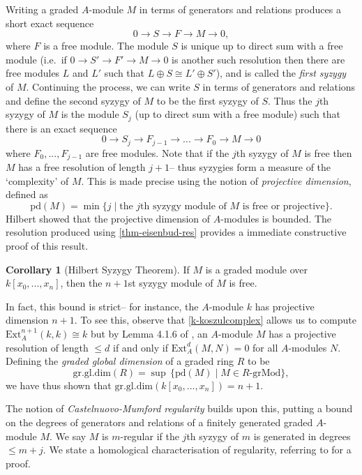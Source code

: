 \documentclass[a4paper]{article}
\theoremstyle{definition}
\newtheorem{cor}[defn]{Corollary}
\theoremstyle{remark}
\newcommand{\grMod}{\ensuremath{\text{-grMod}}}
\begin{document}
Writing a graded \(A\)-module \(M\) in terms of generators and relations
produces a short exact sequence 
\[0\rightarrow S\rightarrow F \rightarrow M \rightarrow 0, \]
where \(F\) is a free module. The module \(S\) is unique up to direct sum with
a free module (i.e.\ if \(0\rightarrow S' \rightarrow F'
\rightarrow M \rightarrow 0\) is another such resolution then
there are free modules \(L\) and \(L'\) such that \(L\oplus S \cong L'\oplus
S'\)), and is called the \textit{first syzygy} of \(M\). Continuing
the process, we can write \(S\) in terms of generators and
relations and define the second syzygy of \(M\) to be the first
syzygy of \(S\). Thus the \(j\)th syzygy of \(M\) is the module \(S_j\) (up to direct sum with a free module) such that there is an exact sequence 
\[0\rightarrow S_j \rightarrow F_{j-1} \rightarrow ...
\rightarrow F_0 \rightarrow M \rightarrow 0\] 
where \(F_0,...,F_{j-1}\) are free modules. Note that if the \(j\)th syzygy of
\(M\) is free then \(M\) has a free resolution of length \(j+1\)-- thus syzygies
form a measure of the `complexity' of \(M\). This is made precise using the
notion of \textit{projective dimension}, defined as
\[\text{pd}(M)=\min\{j\;|\; \text{the }j\text{th syzygy module of \(M\) is free
or projective}\}.\]
Hilbert showed that the projective dimension of \(A\)-modules is bounded. The
resolution produced using \cref{thm-eisenbud-res} provides a immediate
constructive proof of this result.

\begin{cor}[Hilbert Syzygy Theorem]
    If \(M\) is a graded module over \(k[x_0,...,x_n]\), then the \(n+1\)st
    syzygy module of \(M\) is free. 
\end{cor}

In fact, this bound is strict-- for instance, the \(A\)-module \(k\) has
projective dimension \(n+1\). To see this, observe
that \eqref{k-koszulcomplex} allows us to compute \(\text{Ext}^{n+1}_A(k,k)\cong
k\) but by Lemma 4.1.6 of , an \(A\)-module
\(M\) has a projective resolution of length \(\leq d\) if and only if
\(\text{Ext}^{d}_A(M,N)=0\) for all \(A\)-modules \(N\). Defining the
\textit{graded global dimension} of a graded ring \(R\) to be
\[\text{gr.gl.dim}(R)=\sup\,\{\text{pd}(M)\;|\;M\in R\grMod \},\]
we have thus shown that \(\text{gr.gl.dim}(k[x_0,...,x_n])=n+1\).

The notion of \textit{Castelnuovo-Mumford regularity} builds upon this,
putting a bound on the degrees of generators and relations of a finitely
generated graded \(A\)-module \(M\). We say \(M\) is \(m\)-regular if the
\(j\)th syzygy of \(m\) is generated in degrees \(\leq m+j\).
We state a homological characterisation of regularity, referring to
 for a proof. 
\end{document}

